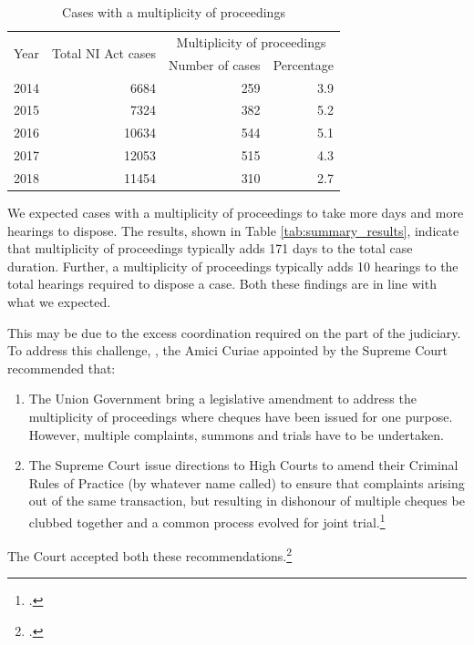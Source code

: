 \documentclass[12pt,a4paper]{article}
\begin{document}
\begin{longtable}{@{}lrrr@{}}
 \caption{Cases with a multiplicity of proceedings}\label{tab:mult_yearWise}\\
\toprule
\multirow{2}{*}{Year} & \multirow{2}{*}{Total NI Act cases} & \multicolumn{2}{c}{Multiplicity of proceedings}\\
\cmidrule{3-4}
&& Number of cases & Percentage \\
\midrule\endhead
2014 & 6684 & 259 & 3.9 \\
2015 & 7324 & 382 & 5.2 \\
2016 & 10634 & 544 & 5.1 \\
2017 & 12053 & 515 & 4.3 \\
2018 & 11454 & 310 & 2.7 \\
\bottomrule
\end{longtable}

We expected cases with a multiplicity of proceedings to take more days and more hearings to dispose. The results, shown in Table \ref{tab:summary_results}, indicate that multiplicity of proceedings typically adds 171 days to the total case duration. Further, a multiplicity of proceedings typically adds 10 hearings to the total hearings required to dispose a case. Both these findings are in line with what we expected.

This may be due to the excess coordination required on the part of the judiciary. To address this challenge, , the Amici Curiae appointed by the Supreme Court recommended that:

\begin{enumerate}
 \item The Union Government bring a legislative amendment to address the multiplicity of proceedings where cheques have been issued for one purpose. However, multiple complaints, summons and trials have to be undertaken. 
 \item The Supreme Court issue directions to High Courts to amend their Criminal Rules of Practice (by whatever name called) to ensure that complaints arising out of the same transaction, but resulting in dishonour of multiple cheques be clubbed together and a common process evolved for joint trial.\footcite{amicus2020_submission}
\end{enumerate}

The Court accepted both these recommendations.\footcite{sc2020_138}
\end{document}
